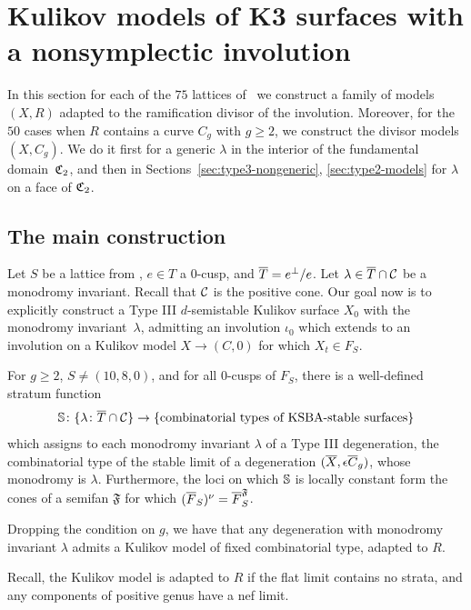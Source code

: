 \documentclass{amsart}
\begin{document}
\section{Kulikov models of K3 surfaces with a nonsymplectic involution}
\label{sec:kulikov-models-all}

In this section for each of the $75$ lattices of \fign\ we construct
a family of models $(X,R)$ adapted to the
ramification divisor of the involution. Moreover, for the $50$
cases when $R$ contains a curve $C_g$ with $g\ge2$, we construct the
divisor models $(X,C_g)$. We do it first for a generic $\lambda$ in the
interior of the fundamental domain~${\mathfrak C}_2$, and then in
Sections~\ref{sec:type3-nongeneric}, \ref{sec:type2-models} for 
$\lambda$ on a face of ${\mathfrak C}_2$. 

\subsection{The main construction}
\label{sec:main-construction}
Let $S$ be a lattice from \fign, $e\in T$ a $0$-cusp, and
${\overline T}=e^\perp/e$. Let $\lambda\in{\overline T}\cap{\mathcal C}$ be a monodromy
invariant. Recall that ${\mathcal C}$ is the positive cone.
Our goal now is to explicitly construct a Type III
$d$-semistable Kulikov surface $X_0$ with the monodromy
invariant~$\lambda$, admitting an involution $\iota_0$
which extends to an involution on a Kulikov model
$X\to (C,0)$ for which $X_t\in F_S$.

\begin{proposition}\label{stratum-function} For $g\ge 2$, $S\neq (10,8,0)$, and for all $0$-cusps of $F_S$,
there is a well-defined {\rm stratum function}
$${\mathbb S}\colon \{\lambda\colon {\overline T}\cap {\mathcal C}\}\to \{\textrm{combinatorial types of KSBA-stable surfaces}\}$$
which assigns to each monodromy invariant $\lambda$ of a Type III degeneration,
the combinatorial type of the stable limit of a degeneration $({\overline X},\epsilon {\overline C}_g)$, 
whose monodromy is $\lambda$.
Furthermore, the loci on which ${\mathbb S}$ is locally constant form the cones of a semifan $\mathfrak{F}$
for which $({\overline F}_S)^\nu = {\overline F}_S^{\mathfrak{F}}$.

Dropping the condition on $g$, we have that any degeneration
with monodromy invariant $\lambda$ admits a Kulikov model of fixed
combinatorial type, adapted to $R$. 
\end{proposition}

Recall, the Kulikov model is adapted to $R$ if the flat limit contains no strata, and any
components of positive genus have a nef limit.
\end{document}

